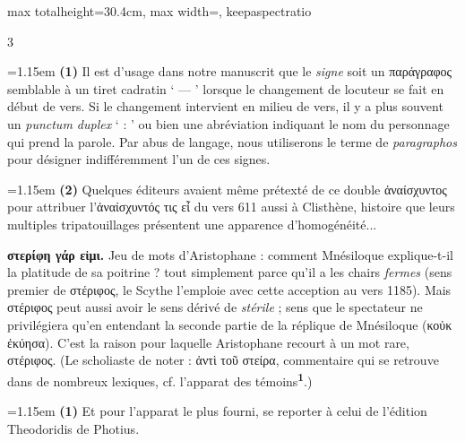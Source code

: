\documentclass[11pt,twoside]{book}
\newcommand{\italique}[1]{\textit{#1}}
\newcommand{\latin}[1]{\textit{#1}}
\newcommand{\marqueur}[1]{\textsuperscript{\color{rubricRed}\textbf{#1}}}
\begin{document}
\begin{adjustbox}{max totalheight=30.4cm, max width=\textwidth, keepaspectratio}
\begin{minipage}{\textwidth}
{\begin{multicols}{3}
\par\vspace{1.2pt}\par\nopagebreak\vspace{1pt}\noindent\hangindent=1.15em {\color{sepiaNote}\textbf{(1)}} Il est d'usage dans notre manuscrit que le \italique{signe} soit un παράγραφος semblable à un tiret cadratin ` --- ' lorsque le changement de locuteur se fait en début de vers. Si le changement intervient en milieu de vers, il y a plus souvent un \latin{punctum duplex} ` : ' ou bien une abréviation indiquant le nom du personnage qui prend la parole. Par abus de langage, nous utiliserons le terme de \italique{paragraphos} pour désigner indifféremment l'un de ces signes.
\par\vspace{1.5pt}
\noindent\hangindent=1.15em {\color{sepiaNote}\textbf{(2)}} Quelques éditeurs avaient même prétexté de ce double ἀναίσχυντος pour attribuer l'ἀναίσχυντός τις εἶ du vers 611 aussi à Clisthène, histoire que leurs multiples tripatouillages présentent une apparence d'homogénéité...
\par\vspace{1.5pt}
 \textbf{στερίφη γάρ εἰμι.} Jeu de mots d'Aristophane : comment Mnésiloque explique-t-il la platitude de sa poitrine ? tout simplement parce qu'il a les chairs \italique{fermes} (sens premier de στέριφος, le Scythe l'emploie avec cette acception au vers 1185). Mais στέριφος peut aussi avoir le sens dérivé de \italique{stérile} ; sens que le spectateur ne privilégiera qu'en entendant la seconde partie de la réplique de Mnésiloque (κοὐκ ἐκύησα). C'est la raison pour laquelle Aristophane recourt à un mot rare, στέριφος. (Le scholiaste de noter : ἀντὶ τοῦ στείρα, commentaire qui se retrouve dans de nombreux lexiques, cf. l'apparat des témoins\marqueur{1}.)
\par\vspace{1.5pt}
\par\vspace{1.2pt}\par\nopagebreak\vspace{1pt}\noindent\hangindent=1.15em {\color{sepiaNote}\textbf{(1)}} Et pour l'apparat le plus fourni, se reporter à celui de l'édition Theodoridis de Photius.

\end{multicols}}
\end{minipage}
\end{adjustbox}
\end{document}
